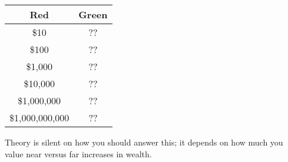 \begin{table}[htbp]
\begin{minipage}{\linewidth}
\setlength{\tymax}{0.5\linewidth}
\centering
\small
\begin{tabulary}{\textwidth}{@{}cc@{}} \toprule
 Red & Green \\
\midrule

 \$10 & ?? \\
 \$100 & ?? \\
 \$1,000 & ?? \\
 \$10,000 & ?? \\
 \$1,000,000 & ?? \\
 \$1,000,000,000 & ?? \\
\bottomrule

\end{tabulary}
\end{minipage}
\end{table}

Theory is silent on how you should answer this; it depends on how much you value near versus far increases in wealth.


